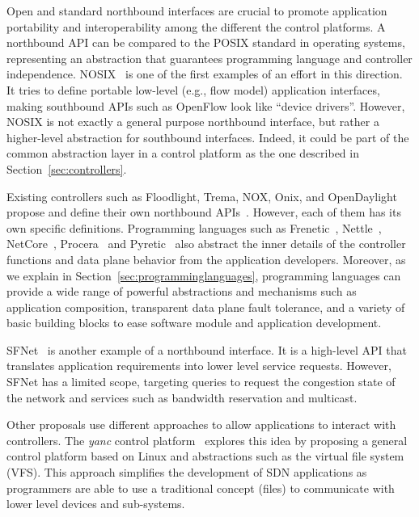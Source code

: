 Open and standard northbound interfaces are crucial to promote application portability and interoperability among the different the control platforms.
A northbound API can be compared to the POSIX standard in operating systems, representing an abstraction that guarantees programming language and controller independence.
NOSIX~\cite{wundsam2012} is one of the first examples of an effort in this direction. It tries to 
define portable low-level (e.g., flow model) application interfaces, making southbound APIs such as OpenFlow 
look like ``device drivers''. However, NOSIX is not exactly a general purpose northbound interface, but 
rather a higher-level abstraction for southbound interfaces. Indeed, it could be part of the common 
abstraction layer in a control platform as the one described in Section~\ref{sec:controllers}.

Existing controllers such as Floodlight, Trema, NOX, Onix, and OpenDaylight propose and define their own northbound 
APIs~\cite{salisbury2012-1,chua2012}.
However, each of them has its own specific definitions.
Programming languages such as Frenetic~\cite{foster2011}, Nettle~\cite{voellmy2011-1}, NetCore~\cite{monsanto2012}, Procera~\cite{voellmy2012} and Pyretic~\cite{reich2013} also abstract the inner details of the controller functions and data plane behavior from the application developers.
Moreover, as we explain in 
Section~\ref{sec:programminglanguages}, programming languages can provide a wide range of powerful 
abstractions and mechanisms such as application composition, transparent data plane fault tolerance, 
and a variety of basic building blocks to ease software module and application development.

SFNet~\cite{yap2010} is another example of a northbound interface. It is a high-level API that 
translates application requirements into lower level service requests. However, SFNet has a limited scope, 
targeting queries to request the congestion state of the network and services such as bandwidth reservation 
and multicast.

Other proposals use different approaches to allow applications to 
interact with controllers. The \textit{yanc} control platform~\cite{monaco2013} explores 
this idea by proposing a general control platform based on Linux and abstractions such as the virtual file 
system (VFS). This approach simplifies the development of SDN applications as programmers are able to use
a traditional concept (files) to communicate with lower level devices and sub-systems.
 
